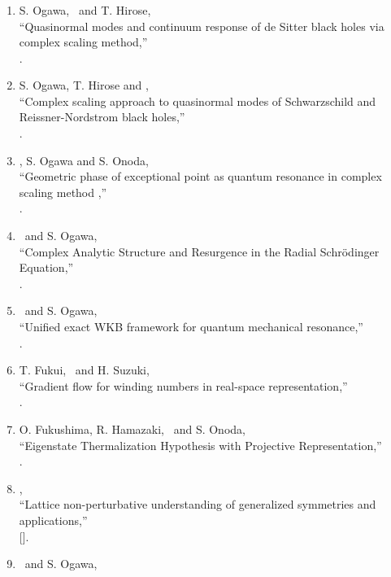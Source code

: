 \subsubsection{\JPS}
\begin{enumerate}
 \item S. Ogawa, \OM\ and T. Hirose,\\
       ``Quasinormal modes and continuum response of de Sitter black holes via complex scaling method,''\\
       .
 \item S. Ogawa, T. Hirose and \OM,\\
       ``Complex scaling approach to quasinormal modes of Schwarzschild and Reissner-Nordstrom black holes,''\\
       .
 \item \OM, S. Ogawa and S. Onoda,\\
       ``Geometric phase of exceptional point as quantum resonance in complex scaling method
,''\\
       .
 \item \OM\ and S. Ogawa,\\
       ``Complex Analytic Structure and Resurgence in the Radial Schr\"odinger Equation,''\\
       .
 \item \OM\ and S. Ogawa,\\
       ``Unified exact WKB framework for quantum mechanical resonance,''\\
       .
 \item T. Fukui, \OM\ and H. Suzuki,\\
       ``Gradient flow for winding numbers in real-space representation,''\\
       .
 \item O. Fukushima, R. Hamazaki, \OM\ and S. Onoda,\\
       ``Eigenstate Thermalization Hypothesis with Projective Representation,''\\
       .
 \item \OM,\\
       ``Lattice non-perturbative understanding of generalized symmetries and applications,''\\
       [].
 \item \OM\ and S. Ogawa,\\

\end{enumerate}
